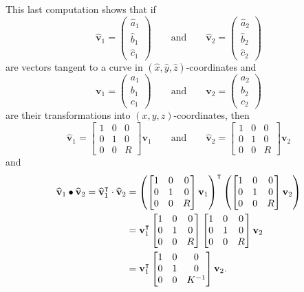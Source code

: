 \documentclass[newpage,hints,handout]{ximera}
\begin{document}
This last computation shows that if
\[
\hat{\mathbf v}_{1}=\begin{pmatrix}\hat{a}_{1} \\ \hat{b}_{1} \\ \hat{c}_{1}\end{pmatrix}
\qquad\text{and}\qquad
\hat{\mathbf v}_{2} =\begin{pmatrix}\hat{a}_{2} \\ \hat{b}_{2} \\ \hat{c}_{2}\end{pmatrix}
\]
are vectors tangent to a curve in $(\hat{x},\hat{y},\hat{z})$-coordinates and
\[
\mathbf{v}_{1}=\begin{pmatrix}a_{1} \\ b_{1} \\ c_{1}\end{pmatrix}
\qquad\text{and}\qquad
\mathbf{v}_{2} =\begin{pmatrix}a_{2} \\ b_{2} \\ c_{2}\end{pmatrix}
\]
are their transformations into $(x,y,z)$-coordinates, then
\[
\hat{\mathbf v}_{1}=
\begin{bmatrix}
1 & 0 & 0\\
0 & 1 & 0\\
0 & 0 & R
\end{bmatrix}\mathbf{v}_{1}
\qquad\text{and}\qquad
\hat{\mathbf v}_{2}=
\begin{bmatrix}
1 & 0 & 0\\
0 & 1 & 0\\
0 & 0 & R
\end{bmatrix}\mathbf{v}_{2} 
\]
and%
\begin{align*}
\hat{\mathbf v}_{1}\bullet\hat{\mathbf v}_{2}
=\hat{\mathbf v}_{1}^\transpose \cdot \hat{\mathbf v}_{2} 
&= 
\left(\begin{bmatrix}
1 & 0 & 0\\
0 & 1 & 0\\
0 & 0 & R
\end{bmatrix}\mathbf{v}_{1}\right)^\transpose
\left(
\begin{bmatrix}
1 & 0 & 0\\
0 & 1 & 0\\
0 & 0 & R
\end{bmatrix}\mathbf{v}_{2}\right)\\
&=\mathbf{v}_{1}^\transpose
\begin{bmatrix}
1 & 0 & 0\\
0 & 1 & 0\\
0 & 0 & R
\end{bmatrix}
\begin{bmatrix}
1 & 0 & 0\\
0 & 1 & 0\\
0 & 0 & R
\end{bmatrix}
\mathbf{v}_{2}\\
&=\mathbf{v}_{1}^\transpose
\begin{bmatrix}
1 & 0 & 0\\
0 & 1 & 0\\
0 & 0 & K^{-1}%
\end{bmatrix}
\mathbf{v}_{2}.
\end{align*}
\end{document}
